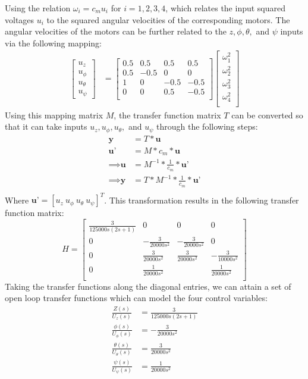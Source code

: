 \documentclass[12pt]{article}
\begin{document}
Using the relation $\omega_i = c_mu_i$ for $i = 1,2,3,4$, 
which relates the input squared voltages $u_i$ to the squared angular velocities of the corresponding motors.
The angular velocities of the motors can be further related to the $z,\phi, \theta,$ and $\psi$ inputs via 
the following mapping:
\begin{align*}
  \begin{bmatrix}
    u_z \\
    u_{\phi} \\
    u_{\theta} \\
    u_{\psi} 
  \end{bmatrix}
  &= 
  \begin{bmatrix}
    0.5 & 0.5 & 0.5 & 0.5 \\
    0.5 & -0.5 & 0 & 0 \\
    1 & 0 & -0.5 & -0.5 \\
    0 & 0 & 0.5 & -0.5 \\
  \end{bmatrix}
  \begin{bmatrix}
    \omega_1^2 \\
    \omega_2^2 \\
    \omega_3^2 \\
    \omega_4^2 \\
  \end{bmatrix}
\end{align*}
Using this mapping matrix $M$, the transfer function matrix $T$ can be converted
so that it can take inputs $u_z, u_{\phi}, u_{\theta},$ and $u_{\psi}$
through the following steps:
\begin{align*}
   \textbf{y} &= T*\textbf{u} \\
   \textbf{u'} &= M*c_m*\textbf{u} \\
   \implies \textbf{u} &= M^{-1}*\frac{1}{c_m}*\textbf{u'} \\
   \implies \textbf{y} &= T*M^{-1}*\frac{1}{c_m}*\textbf{u'} \\
\end{align*}
Where $\textbf{u'} = [u_z \ u_{\phi} \ u_{\theta} \ u_{\psi}]^T$. This transformation results in 
the following transfer function matrix:
\[
  H =
\begin{bmatrix}
  \frac{3}{125000s(2s + 1)} & 0 & 0 & 0 \\[6pt]
    0 & -\frac{3}{20000s^2} & -\frac{3}{20000s^2} & 0 \\[6pt]
    0 & \frac{3}{20000s^2} & \frac{3}{20000s^2} & -\frac{3}{10000s^2} \\[6pt]
    0 &  \frac{1}{20000s^2}&  & \frac{1}{20000s^2} \\[6pt]
\end{bmatrix}
\]
Taking the transfer functions along the diagonal entries, we can attain a set of open loop transfer functions
which can model the four control variables:
\begin{align*}
  \frac{Z(s)}{U_z(s)} &= \frac{3}{125000s(2s + 1)}\\
  \frac{\phi(s)}{U_{\phi}(s)} &= -\frac{3}{20000s^2}\\
  \frac{\theta(s)}{U_{\theta}(s)} &= \frac{3}{20000s^2}\\
  \frac{\psi(s)}{U_{\psi}(s)} &= \frac{1}{20000s^2}
\end{align*} 
\end{document}
